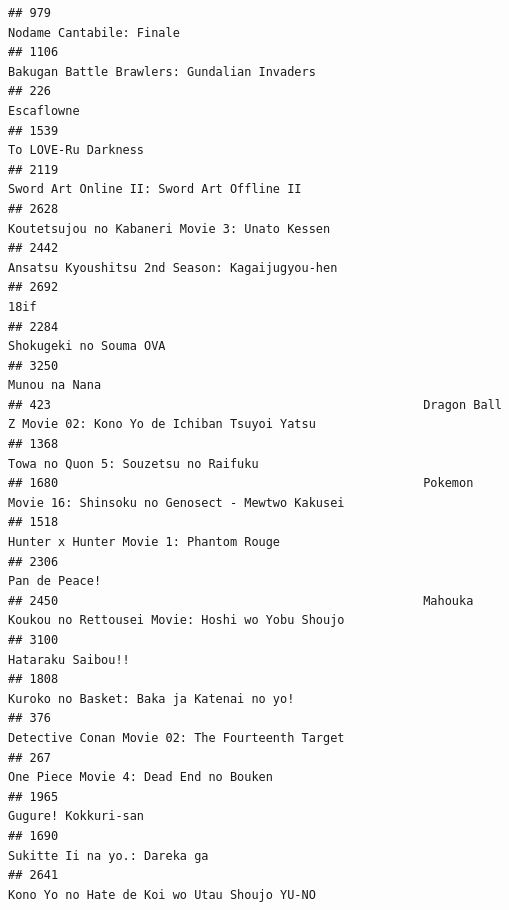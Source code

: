 \documentclass[
]{article}
\begin{document}
\begin{verbatim}
## 979                                                                                   Nodame Cantabile: Finale
## 1106                                                               Bakugan Battle Brawlers: Gundalian Invaders
## 226                                                                                                 Escaflowne
## 1539                                                                                       To LOVE-Ru Darkness
## 2119                                                                 Sword Art Online II: Sword Art Offline II
## 2628                                                             Koutetsujou no Kabaneri Movie 3: Unato Kessen
## 2442                                                            Ansatsu Kyoushitsu 2nd Season: Kagaijugyou-hen
## 2692                                                                                                      18if
## 2284                                                                                    Shokugeki no Souma OVA
## 3250                                                                                             Munou na Nana
## 423                                                    Dragon Ball Z Movie 02: Kono Yo de Ichiban Tsuyoi Yatsu
## 1368                                                                       Towa no Quon 5: Souzetsu no Raifuku
## 1680                                                   Pokemon Movie 16: Shinsoku no Genosect - Mewtwo Kakusei
## 1518                                                                    Hunter x Hunter Movie 1: Phantom Rouge
## 2306                                                                                             Pan de Peace!
## 2450                                                   Mahouka Koukou no Rettousei Movie: Hoshi wo Yobu Shoujo
## 3100                                                                                         Hataraku Saibou!!
## 1808                                                                  Kuroko no Basket: Baka ja Katenai no yo!
## 376                                                            Detective Conan Movie 02: The Fourteenth Target
## 267                                                                      One Piece Movie 4: Dead End no Bouken
## 1965                                                                                       Gugure! Kokkuri-san
## 1690                                                                              Sukitte Ii na yo.: Dareka ga
## 2641                                                               Kono Yo no Hate de Koi wo Utau Shoujo YU-NO

\end{verbatim}
\end{document}
